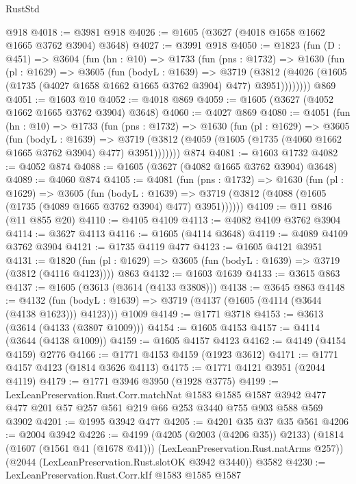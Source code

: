 \begin{lexlean}{RustStd}
\begin{coremodule}
{\begin{coremodule}
{{{{{{{{{{{{{{    @918
@4018 := @3981 @918
@4026 := @1605 (@3627 (@4018 @1658 @1662 @1665 @3762 @3904) @3648)
@4027 := @3991 @918
@4050 := @1823
    (fun (D : @451) =>
    @3604
      (fun (hn : @10) =>
      @1733
        (fun (pns : @1732) =>
        @1630
          (fun (pl : @1629) =>
          @3605
            (fun (bodyL : @1639) =>
            @3719
              (@3812 (@4026 (@1605 (@1735 (@4027 @1658 @1662 @1665 @3762 @3904) @477) @3951))))))))
    @869
@4051 := @1603 @10
@4052 := @4018 @869
@4059 := @1605 (@3627 (@4052 @1662 @1665 @3762 @3904) @3648)
@4060 := @4027 @869
@4080 := @4051
    (fun (hn : @10) =>
    @1733
      (fun (pns : @1732) =>
      @1630
        (fun (pl : @1629) =>
        @3605
          (fun (bodyL : @1639) =>
          @3719 (@3812 (@4059 (@1605 (@1735 (@4060 @1662 @1665 @3762 @3904) @477) @3951)))))))
    @874
@4081 := @1603 @1732
@4082 := @4052 @874
@4088 := @1605 (@3627 (@4082 @1665 @3762 @3904) @3648)
@4089 := @4060 @874
@4105 := @4081
    (fun (pns : @1732) =>
    @1630
      (fun (pl : @1629) =>
      @3605
        (fun (bodyL : @1639) =>
        @3719 (@3812 (@4088 (@1605 (@1735 (@4089 @1665 @3762 @3904) @477) @3951))))))
@4109 := @11 @846 (@11 @855 @20)
@4110 := @4105 @4109
@4113 := @4082 @4109 @3762 @3904
@4114 := @3627 @4113
@4116 := @1605 (@4114 @3648)
@4119 := @4089 @4109 @3762 @3904
@4121 := @1735 @4119 @477
@4123 := @1605 @4121 @3951
@4131 := @1820 (fun (pl : @1629) => @3605 (fun (bodyL : @1639) => @3719 (@3812 (@4116 @4123)))) @863
@4132 := @1603 @1639
@4133 := @3615 @863
@4137 := @1605 (@3613 (@3614 (@4133 @3808)))
@4138 := @3645 @863
@4148 := @4132
    (fun (bodyL : @1639) => @3719 (@4137 (@1605 (@4114 (@3644 (@4138 @1623))) @4123)))
    @1009
@4149 := @1771 @3718
@4153 := @3613 (@3614 (@4133 (@3807 @1009)))
@4154 := @1605 @4153
@4157 := @4114 (@3644 (@4138 @1009))
@4159 := @1605 @4157 @4123
@4162 := @4149 (@4154 @4159) @2776
@4166 := @1771 @4153 @4159 (@1923 @3612)
@4171 := @1771 @4157 @4123 (@1814 @3626 @4113)
@4175 := @1771 @4121 @3951 (@2044 @4119)
@4179 := @1771 @3946 @3950 (@1928 @3775)
@4199 := LexLeanPreservation.Rust.Corr.matchNat
    @1583
    @1585
    @1587
    @3942
    @477
    @477
    @201
    @57
    @257
    @561
    @219
    @66
    @253
    @3440
    @755
    @903
    @588
    @569
    @3902
@4201 := @1995 @3942 @477
@4205 := @4201 @35 @37 @35 @561
@4206 := @2004 @3942
@4226 := @4199
    (@4205 (@2003 (@4206 @35)) @2133)
    (@1814 (@1607 (@1561 @41 (@1678 @41))) (LexLeanPreservation.Rust.natArms @257))
    (@2044 (LexLeanPreservation.Rust.slotOK @3942 @3440))
    @3582
@4230 := LexLeanPreservation.Rust.Corr.kIf @1583 @1585 @1587
}}}}}}}}}}}}}}
\end{coremodule}}
\end{coremodule}
\end{lexlean}
